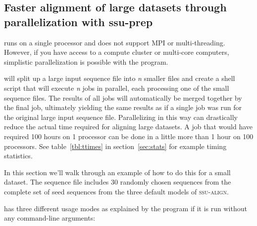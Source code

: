 \subsection{Faster alignment of large datasets through parallelization
  with ssu-prep}
\label{sec:tutorial-prep}
 runs on a single processor and does not support MPI
or multi-threading. However, if you have access to a compute
cluster or multi-core computers, simplistic parallelization is possible
with the  program.

 will split up a large input sequence file into
\emph{n} smaller files and create a shell script that will execute
\emph{n}  jobs in parallel, each processing one of the
small sequence files. The results of all jobs will automatically be
merged together by the final job, ultimately yielding the same results
as if a single 
job was run for the original large input sequence file. 
Parallelizing  in this way can drastically reduce the
actual time required for aligning large datasets. A job that would
have required 100 hours on 1 processor can be done in a little more
than 1 hour on 100 processors. See table~\ref{tbl:ttimes} in
section~\ref{sec:stats} for example timing statistics. 

In this section we'll walk through an example of how to do this for a
small dataset.  The sequence file  includes
30 randomly chosen sequences from the complete set of seed sequences
from the three default models of \textsc{ssu-align}.

 has three different usage modes as explained by the
program if it is run without any command-line arguments:



